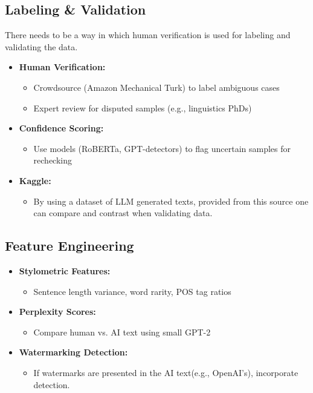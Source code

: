 \documentclass{article} %
\begin{document}
\subsection{Labeling \& Validation}
There needs to be a way in which human verification is used for labeling and validating the data.

\begin{itemize}
    \item \textbf{Human Verification:}
    \begin{itemize}
        \item Crowdsource (Amazon Mechanical Turk) to label ambiguous cases
        \item Expert review for disputed samples (e.g., linguistics PhDs)
    \end{itemize}
    
    \item \textbf{Confidence Scoring:}
    \begin{itemize}
        \item Use models (RoBERTa, GPT-detectors) to flag uncertain samples for rechecking
    \end{itemize}

    \item \textbf{Kaggle:}
    \begin{itemize}
        \item By using a dataset of LLM generated texts, provided from this source one can compare and contrast when validating data.
    \end{itemize}
\end{itemize}

\subsection{Feature Engineering}
\begin{itemize}
    \item \textbf{Stylometric Features:}
    \begin{itemize}
        \item Sentence length variance, word rarity, POS tag ratios
    \end{itemize}
    
    \item \textbf{Perplexity Scores:}
    \begin{itemize}
        \item Compare human vs. AI text using small GPT-2
    \end{itemize}
    
    \item \textbf{Watermarking Detection:}
    \begin{itemize}
        \item If watermarks are presented in the AI text(e.g., OpenAI's), incorporate detection.
    \end{itemize}
\end{itemize}
\end{document}

